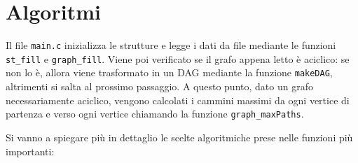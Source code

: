 \documentclass[a4paper]{article}
\newcommand{\code}[1]{\texttt{#1}}
\begin{document}
    \section{Algoritmi}
    
    Il file \code{main.c} inizializza le strutture e legge i dati da file mediante le funzioni \code{st\_fill} e \code{graph\_fill}. Viene poi verificato se il grafo appena letto è aciclico: se non lo è, allora viene trasformato in un DAG mediante la funzione \code{makeDAG}, altrimenti si salta al prossimo passaggio. A questo punto, dato un grafo necessariamente aciclico, vengono calcolati i cammini massimi da ogni vertice di partenza e verso ogni vertice chiamando la funzione \code{graph\_maxPaths}.

    Si vanno a spiegare più in dettaglio le scelte algoritmiche prese nelle funzioni più importanti:
\end{document}
